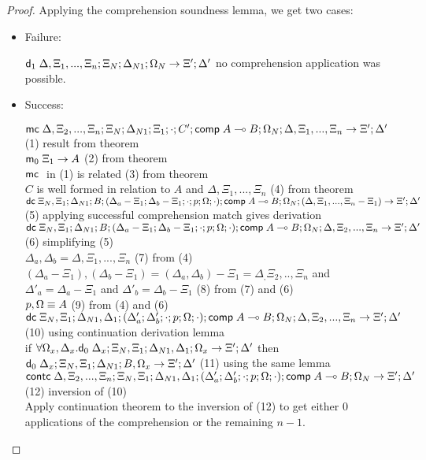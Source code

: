 \begin{proof}
   Applying the comprehension soundness lemma, we get two cases:
   
   \begin{itemize}
      \item Failure:
      
      $\mathsf{d}_1 \; \Delta, \Xi_1, ..., \Xi_n; \Xi_N; \Delta_{N1}; \Omega_N \rightarrow \Xi'; \Delta'$ \hfill no comprehension application was possible.
      
      \item Success:
      
      $\mathsf{mc} \; \Delta, \Xi_2, ..., \Xi_n; \Xi_N; \Delta_{N1}; \Xi_1; \cdot; C'; \mathsf{comp} \; A \multimap B; \Omega_N; \Delta, \Xi_1, ..., \Xi_n \rightarrow \Xi'; \Delta'$ \hfill (1) result from theorem \\
      $\mathsf{m}_0 \; \Xi_1 \rightarrow A$ \hfill (2) from theorem \\
      $\mathsf{mc} \;$ in (1) is related \hfill (3) from theorem \\
      $C$ is well formed in relation to $A$ and $\Delta, \Xi_1, ..., \Xi_n$ \hfill (4) from theorem \\
      
      $\mathsf{dc} \; \Xi_N, \Xi_1; \Delta_{N1}; B; (\Delta_a - \Xi_1; \Delta_b - \Xi_1; \cdot; p; \Omega; \cdot); \mathsf{comp} \; A \multimap B; \Omega_N; (\Delta, \Xi_1, ..., \Xi_n - \Xi_1) \rightarrow \Xi'; \Delta'$ \hfill (5) applying successful comprehension match gives derivation \\
      $\mathsf{dc} \; \Xi_N, \Xi_1; \Delta_{N1}; B; (\Delta_a - \Xi_1; \Delta_b - \Xi_1; \cdot; p; \Omega; \cdot); \mathsf{comp} \; A \multimap B; \Omega_N; \Delta, \Xi_2, ..., \Xi_n \rightarrow \Xi'; \Delta'$ \hfill (6) simplifying (5) \\
      $\Delta_a, \Delta_b = \Delta, \Xi_1, ..., \Xi_n$ \hfill (7) from (4) \\
      $(\Delta_a - \Xi_1), (\Delta_b - \Xi_1) = (\Delta_a, \Delta_b) - \Xi_1 = \Delta_, \Xi_2, .., \Xi_n$ and $\Delta'_a = \Delta_a - \Xi_1$ and $\Delta'_b = \Delta_b - \Xi_1$ \hfill (8) from (7) and (6) \\
      $p, \Omega \equiv A$ \hfill (9) from (4) and (6) \\
      $\mathsf{dc} \; \Xi_N, \Xi_1; \Delta_{N1}, \Delta_1; (\Delta'_a; \Delta'_b; \cdot; p; \Omega; \cdot); \mathsf{comp} \; A \multimap B; \Omega_N; \Delta, \Xi_2, ..., \Xi_n \rightarrow \Xi'; \Delta'$ \hfill (10) using continuation derivation lemma \\
      if $\forall \Omega_x, \Delta_x. \mathsf{d}_0 \; \Delta_x; \Xi_N, \Xi_1; \Delta_{N1}, \Delta_1; \Omega_x \rightarrow \Xi'; \Delta'$ then $\mathsf{d}_0 \; \Delta_x; \Xi_N, \Xi_1; \Delta_{N1}; B, \Omega_x \rightarrow \Xi'; \Delta'$ \hfill (11) using the same lemma \\ 
      $\mathsf{contc} \; \Delta, \Xi_2, ..., \Xi_n; \Xi_N, \Xi_1; \Delta_{N1}, \Delta_1; (\Delta'_a; \Delta'_b; \cdot; p; \Omega; \cdot); \mathsf{comp} \; A \multimap B; \Omega_N \rightarrow \Xi'; \Delta'$ \hfill (12) inversion of (10) \\
      Apply continuation theorem to the inversion of (12) to get either $0$ applications of the comprehension or the remaining $n-1$.
   \end{itemize}
\end{proof}

